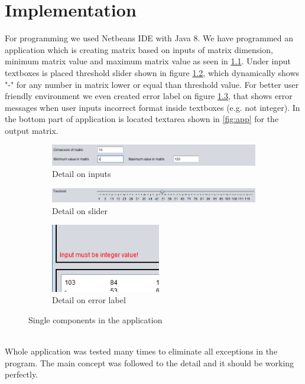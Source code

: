 \documentclass[12pt]{report}
\begin{document}
\chapter{Implementation}
For programming we used Netbeans IDE with Java 8. We have programmed an application which is creating matrix based on inputs of matrix dimension, minimum matrix value and maximum matrix value as seen in \ref{fig:inputs}. Under input textboxes is placed threshold slider shown in figure \ref{fig:slider}, which dynamically shows "-" for any number in matrix lower or equal than threshold value. For better user friendly environment we even created error label on figure \ref{fig:errlabel}, that shows error messages when user inputs incorrect format inside textboxes (e.g. not integer). In the bottom part of application is located textarea shown in \ref{fig:app} for the output matrix.
\begin{figure}[!ht]
\centering
\begin{subfigure}{\textwidth} 
  \centering
  \includegraphics[width=\linewidth]{img/inputs.PNG}
  \caption{Detail on inputs}
  \label{fig:inputs}
\end{subfigure}
\begin{subfigure}{\textwidth}
  \centering
  \includegraphics[width=\linewidth]{img/threshold.PNG}
  \caption{Detail on slider}
  \label{fig:slider}
\end{subfigure}
\begin{subfigure}{\textwidth}
  \centering
  \includegraphics[height=3cm, keepaspectratio]{img/errlabel.PNG}
  \caption{Detail on error label}
  \label{fig:errlabel}
\end{subfigure}
\caption{Single components in the application}
\label{fig:compview}
\end{figure}
\\
Whole application was tested many times to eliminate all exceptions in the program. The main concept was followed to the detail and it should be working perfectly.
\end{document}
